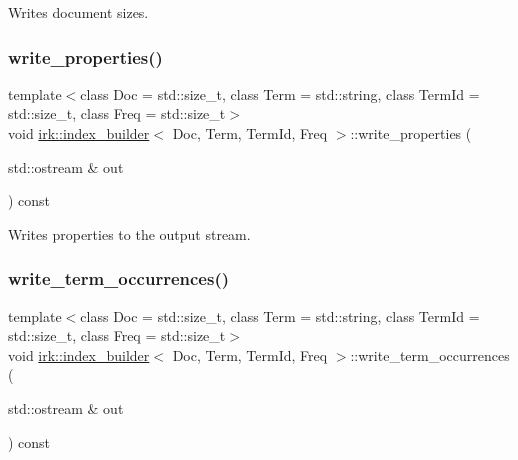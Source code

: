 Writes document sizes. 

\mbox{\label{classirk_1_1index__builder_a72af15b21025b78e52b36ba27d1a74c9}} 
\subsubsection{\texorpdfstring{write\+\_\+properties()}{write\_properties()}}
{\footnotesize\ttfamily template$<$class Doc  = std\+::size\+\_\+t, class Term  = std\+::string, class Term\+Id  = std\+::size\+\_\+t, class Freq  = std\+::size\+\_\+t$>$ \\
void \mbox{\hyperlink{classirk_1_1index__builder}{irk\+::index\+\_\+builder}}$<$ Doc, Term, Term\+Id, Freq $>$\+::write\+\_\+properties (\begin{DoxyParamCaption}\item[{std\+::ostream \&}]{out }\end{DoxyParamCaption}) const\hspace{0.3cm}{\ttfamily [inline]}}



Writes properties to the output stream. 

\mbox{\label{classirk_1_1index__builder_a624ac52ee94b6d6e9b3a7c2521d550a1}} 
\subsubsection{\texorpdfstring{write\+\_\+term\+\_\+occurrences()}{write\_term\_occurrences()}}
{\footnotesize\ttfamily template$<$class Doc  = std\+::size\+\_\+t, class Term  = std\+::string, class Term\+Id  = std\+::size\+\_\+t, class Freq  = std\+::size\+\_\+t$>$ \\
void \mbox{\hyperlink{classirk_1_1index__builder}{irk\+::index\+\_\+builder}}$<$ Doc, Term, Term\+Id, Freq $>$\+::write\+\_\+term\+\_\+occurrences (\begin{DoxyParamCaption}\item[{std\+::ostream \&}]{out }\end{DoxyParamCaption}) const\hspace{0.3cm}{\ttfamily [inline]}}



